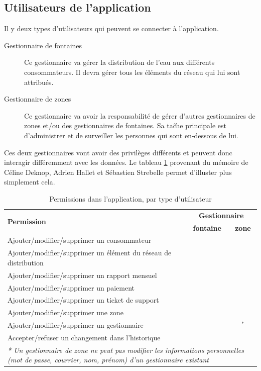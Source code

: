 \documentclass{EPL-master-thesis-covers-FR}
\newcommand{\cmark}{\ding{51}}%
\newcommand{\xmark}{\ding{55}}%
\begin{document}
							
			\subsection{Utilisateurs de l'application}
				Il y deux types d'utilisateurs qui peuvent se connecter à l'application.
				
				\begin{description}
					\item[Gestionnaire de fontaines] Ce gestionnaire va gérer la distribution de l'eau aux différents consommateurs. Il devra gérer tous les éléments du réseau qui lui sont attribués.
					\item[Gestionnaire de zones] Ce gestionnaire va avoir la responsabilité de gérer d'autres gestionnaires de zones et/ou des gestionnaires de fontaines. Sa taĉhe principale est d'administrer et de surveiller les personnes qui sont en-dessous de lui.			 
				\end{description}
				
				Ces deux gestionnaires vont avoir des privilèges différents et peuvent donc interagir différemment avec les données. Le tableau \ref{tab:permissions} provenant du mémoire de Céline Deknop, Adrien Hallet et Sébastien Strebelle \cite{ref:haitiwater} permet d'illuster plus simplement cela.
				
				\begin{table}[H]
					\centering
					\small
					\setlength\tabcolsep{2pt}
					\begin{tabular}{|l|c|c|}
						\hline
						\multirow{2}{*}{\textbf{Permission}} & \multicolumn{2}{c|}{\textbf{Gestionnaire}} \\ \cline{2-3}
						 & \textbf{fontaine} & \textbf{zone} \\ \hline
						 Ajouter/modifier/supprimer un consommateur & \cmark & \cmark \\ \hline
						 Ajouter/modifier/supprimer un élément du réseau de distribution & \cmark & \cmark \\ \hline
						 Ajouter/modifier/supprimer un rapport mensuel & \cmark & \cmark \\ \hline
						 Ajouter/modifier/supprimer un paiement & \cmark & \cmark \\ \hline
						 Ajouter/modifier/supprimer un ticket de support & \cmark & \cmark \\ \hline
						 Ajouter/modifier/supprimer une zone & \xmark & \cmark \\ \hline
						 Ajouter/modifier/supprimer un gestionnaire & \xmark & \cmark$^{*}$ \\ \hline
						 Accepter/refuser un changement dans l'historique & \xmark & \cmark \\ \hline
						 \multicolumn{3}{p{\textwidth}}{\emph{* Un gestionnaire de zone ne peut pas modifier les informations personnelles (mot de passe, courrier, nom, prénom) d'un gestionnaire existant}} \\
					\end{tabular}
					\caption{Permissions dans l'application, par type d'utilisateur}
					\label{tab:permissions}
				\end{table}
				
\end{document}
